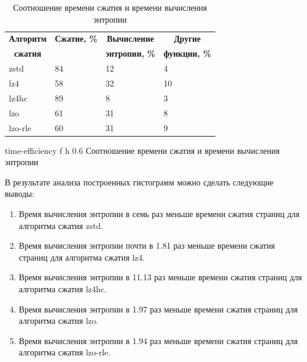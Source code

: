 \begin{table}[h]
    \caption{Соотношение времени сжатия и времени вычисления энтропии}
    \begin{center}
        \begin{tabular}{|l|l|l|l|}
                \hline
            \multicolumn{1}{|c}{\textbf{Алгоритм}} & 
            \multicolumn{1}{|c|}{\textbf{Сжатие, \%}} &
            \multicolumn{1}{c|}{\textbf{Вычисление}} &
            \multicolumn{1}{c|}{\textbf{Другие}} \\
            \multicolumn{1}{|c}{\textbf{сжатия}} & 
            \multicolumn{1}{|c|}{\textbf{}} &
            \multicolumn{1}{c|}{\textbf{энтропии, \%}} &
            \multicolumn{1}{c|}{\textbf{функции, \%}} \\ \hline
            zstd & 84 & 12 & 4 \\ \hline
            lz4 & 58 & 32 & 10 \\ \hline
            lz4hc & 89 & 8 & 3 \\ \hline
            lzo & 61 & 31 & 8 \\ \hline
            lzo-rle & 60 & 31 & 9 \\ \hline
        \end{tabular}
    \end{center}
    \label{tab:time-efficiency}
\end{table}

    {time-efficiency}
    {f}
    {h}
    {0.6\textwidth}
    {Соотношение времени сжатия и времени вычисления энтропии}

В результате анализа построенных гистограмм можно сделать следующие выводы:

\begin{enumerate}
    \item Время вычисления энтропии в семь раз меньше времени сжатия страниц для алгоритма сжатия zstd.
    \item Время вычисления энтропии почти в 1.81 раз меньше времени сжатия страниц для алгоритма сжатия lz4.
    \item Время вычисления энтропии в 11.13 раз меньше времени сжатия страниц для алгоритма сжатия lz4hc.
    \item Время вычисления энтропии в 1.97 раз меньше времени сжатия страниц для алгоритма сжатия lzo.
    \item Время вычисления энтропии в 1.94 раз меньше времени сжатия страниц для алгоритма сжатия lzo-rle.
\end{enumerate}

